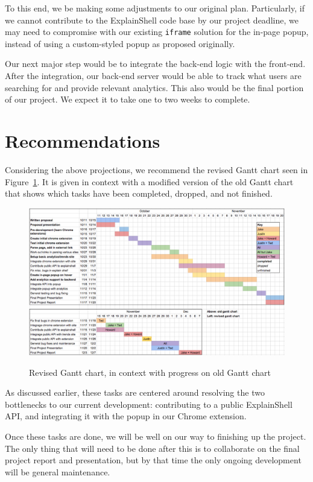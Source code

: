 \documentclass[11pt]{article}
\begin{document}
To this end, we be making some adjustments to our original plan. Particularly,
if we cannot contribute to the ExplainShell code base by our project deadline,
we may need to compromise with our existing \texttt{iframe} solution for the
in-page popup, instead of using a custom-styled popup as proposed originally.

Our next major step would be to integrate the back-end logic with the
front-end. After the integration, our back-end server would be able to
track what users are searching for and provide relevant analytics. This also
would be the final portion of our project. We expect it to take one to two
weeks to complete.

\section{Recommendations}

Considering the above projections, we recommend the revised Gantt
chart seen in Figure~\ref{gantt}. It is given in context with a modified version of the old Gantt chart
that shows which tasks have been completed, dropped, and not finished.
\begin{center}
  \begin{figure}[h]
    \includegraphics[width=\textwidth, keepaspectratio]{../gantt-chart-revised}
    \label{gantt}
    \caption{Revised Gantt chart, in context with progress on old Gantt chart}
  \end{figure}
\end{center}
As discussed earlier, these tasks are centered around resolving the two
bottlenecks to our current development: contributing to a public ExplainShell
API, and integrating it with the popup in our Chrome extension.

Once these tasks are done, we will be well on our way to finishing up the
project. The only thing that will need to be done after this is to collaborate
on the final project report and presentation, but by that time the only ongoing
development will be general maintenance.
\end{document}
